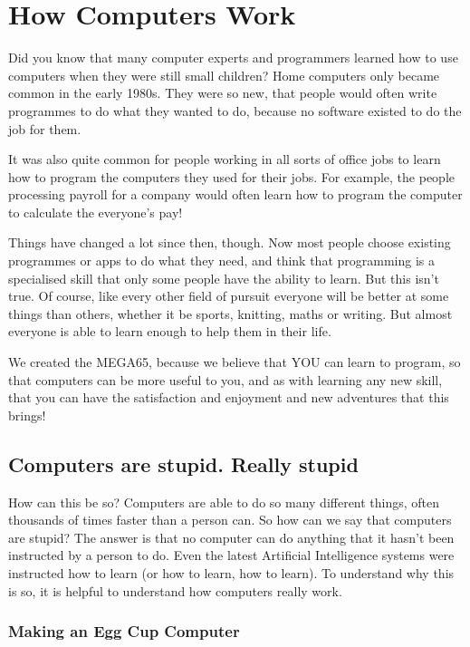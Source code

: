 \chapter{How Computers Work}

Did you know that many computer experts and programmers learned how to
use computers when they were still small children?
Home computers only became common in the early 1980s. They were so new,
that people would often write programmes to do
what they wanted to do, because no software existed to do the job for them.

It was also quite common for people working in all
sorts of office jobs to learn how to program the computers they used for
their jobs.  For example, the people processing payroll
for a company would often learn how to program the computer to calculate
the everyone's pay!

Things have changed a lot since then, though.
Now most people choose existing programmes or apps to do what they need,
and think that programming is a specialised skill that only some people
have the ability to learn.
But this isn't true.  Of course, like every other field of pursuit
everyone will be better at some things than others,
whether it be sports, knitting, maths or writing. But almost
everyone is able to learn enough to help them in their life.

We created the MEGA65, because we believe that YOU can learn to
program, so that computers can be more useful to you, and as with
learning any new skill, that you can have the satisfaction and enjoyment
and new adventures that this brings!


\section{Computers are stupid. Really stupid}

How can this be so? Computers are able to do so many different things, often thousands of times faster than a person can.
So how can we say that computers are stupid?  The answer is that no computer can do anything that it hasn't been instructed
by a person to do.  Even the latest Artificial Intelligence systems were instructed how to learn (or how to learn, how to learn).
To understand why this is so, it is helpful to understand how computers really work.

\subsection{Making an Egg Cup Computer}

